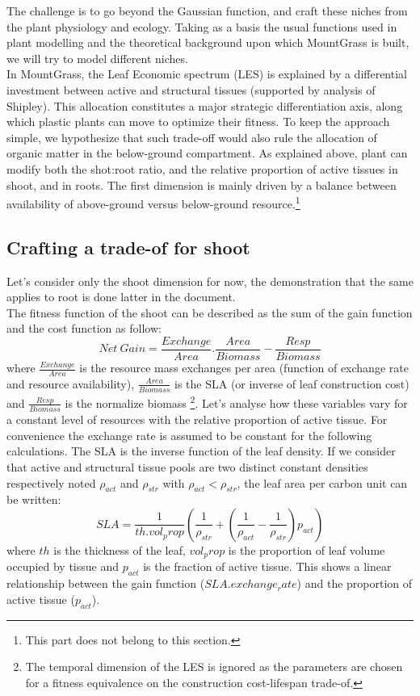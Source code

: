 \documentclass[a4paper, justified,marginals=raggedright]{tufte-handout}
\begin{document}
The challenge is to go beyond the Gaussian function, and craft these niches from the plant physiology and ecology. Taking as a basis the usual functions used in plant modelling and the theoretical background upon which MountGrass is built, we will try to model different niches.\\

\indent In MountGrass, the Leaf Economic spectrum (LES)\cite{Wright-2004} is explained by a differential investment between active and structural tissues (supported by analysis of Shipley\cite{Shipley}). This allocation constitutes a major strategic differentiation axis, along which plastic plants can move to optimize their fitness. To keep the approach simple, we hypothesize that such trade-off would also rule the allocation of organic matter in the below-ground compartment\cite{Reich-2014; Tjoelker-2005}. As explained above, plant can modify both the shot:root ratio, and the relative proportion of active tissues in shoot, and in roots. The first dimension is mainly driven by a balance between availability of above-ground versus below-ground resource.\footnote{This part does not belong to this section.}\\
\subsection{Crafting a trade-of for shoot}
\indent Let's consider only the shoot dimension for now, the demonstration that the same applies to root is done latter in the document.\\
\indent The fitness function of the shoot can be described as the sum of the gain function and the cost function as follow:
\begin{equation}\label{eq:gain}
Net~Gain = \frac{Exchange}{Area} . \frac{Area}{Biomass} - \frac{Resp}{Biomass}
\end{equation}
where $\frac{Exchange}{Area}$ is the resource mass exchanges per area (function of exchange rate and resource availability), $\frac{Area}{Biomass}$ is the SLA (or inverse of leaf construction cost) and $\frac{Resp}{Biomass}$ is the normalize biomass \footnote{The temporal dimension of the LES is ignored as the parameters are chosen for a fitness equivalence on the construction cost-lifespan trade-of.}. Let's analyse how these variables vary for a constant level of resources with the relative proportion of active tissue. For convenience the exchange rate is assumed to be constant for the following calculations.
The SLA is the inverse function of the leaf density. If we consider that active and structural tissue pools are two distinct constant densities respectively noted $\rho_{act}$ and $\rho_{str}$ with $\rho_{act} < \rho_{str}$, the leaf area per carbon unit can be written:
\begin{equation} \label{eq:SLA}
SLA = \frac{1}{th. vol_prop} \left(\frac{1}{\rho_{str}}+\left(\frac{1}{\rho_{act}}-\frac{1}{\rho_{str}}\right)p_{act}\right)
\end{equation}
where $th$ is the thickness of the leaf, $vol_prop$ is the proportion of leaf volume occupied by tissue and $p_{act}$ is the fraction of active tissue. This shows a linear relationship between the gain function ($SLA . exchange_rate$) and the proportion of active tissue ($p_{act}$).
\end{document}

